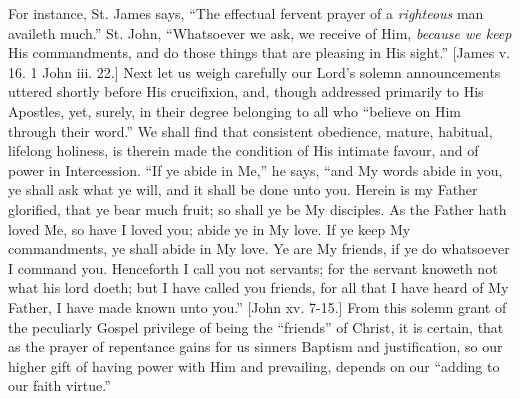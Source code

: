 For instance, St. James says, ``The effectual fervent prayer of
a \emph{righteous} man availeth much.'' St. John, ``Whatsoever
we ask, we receive of Him, \emph{because we keep} His commandments,
and do those things that are pleasing in His sight.'' [James v.
16. 1 John iii. 22.] Next let us weigh carefully our Lord's solemn
announcements uttered shortly before His crucifixion, and, though
addressed primarily to His Apostles, yet, surely, in their degree
belonging to all who ``believe on Him through their word.'' We
shall find that consistent obedience, mature, habitual, lifelong
holiness, is therein made the condition of His intimate favour, and of
power in Intercession. ``If ye abide in Me,'' he says,
``and My words abide in you, ye shall ask what ye will, and it
shall be done unto you. Herein is my Father glorified, that ye bear
much fruit; so shall ye be My disciples. As the Father hath loved Me,
so have I loved you; abide ye in My love. If ye keep My commandments,
ye shall abide in My love. Ye are My friends, if ye do whatsoever I
command you. Henceforth I call you not servants; for the servant
knoweth not what his lord doeth; but I have called you friends, for
all that I have heard of My Father, I have made known unto you.''
[John xv. 7-15.] From this solemn grant of the peculiarly Gospel
privilege of being the ``friends'' of Christ, it is certain,
that as the prayer of repentance gains for us sinners Baptism and
justification, so our higher gift of having power with Him and
prevailing, depends on our ``adding to our faith virtue.''

